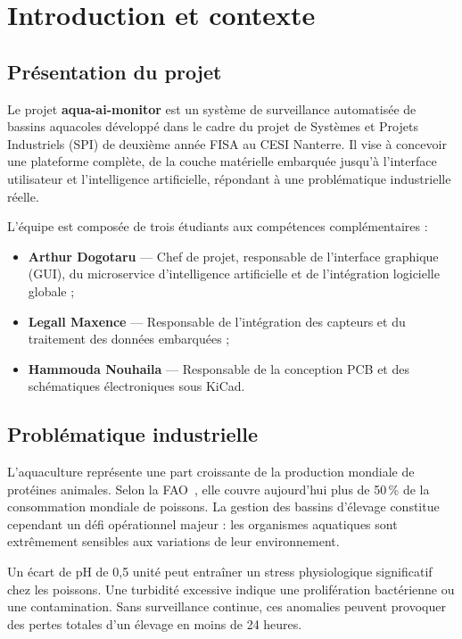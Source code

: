 \documentclass[12pt,a4paper]{report}
\begin{document}
\chapter{Introduction et contexte}

\section{Présentation du projet}

Le projet \textbf{aqua-ai-monitor} est un système de surveillance automatisée de bassins
aquacoles développé dans le cadre du projet de Systèmes et Projets Industriels (SPI) de
deuxième année FISA au CESI Nanterre. Il vise à concevoir une plateforme complète, de la
couche matérielle embarquée jusqu'à l'interface utilisateur et l'intelligence artificielle,
répondant à une problématique industrielle réelle.

L'équipe est composée de trois étudiants aux compétences complémentaires :
\begin{itemize}
  \item \textbf{Arthur Dogotaru} --- Chef de projet, responsable de l'interface graphique (GUI),
        du microservice d'intelligence artificielle et de l'intégration logicielle globale ;
  \item \textbf{Legall Maxence} --- Responsable de l'intégration des capteurs et du traitement
        des données embarquées ;
  \item \textbf{Hammouda Nouhaila} --- Responsable de la conception PCB et des schématiques
        électroniques sous KiCad.
\end{itemize}

\section{Problématique industrielle}

L'aquaculture représente une part croissante de la production mondiale de protéines animales.
Selon la FAO~\cite{fao_aquaculture}, elle couvre aujourd'hui plus de 50\,\% de la consommation
mondiale de poissons. La gestion des bassins d'élevage constitue cependant un défi opérationnel
majeur : les organismes aquatiques sont extrêmement sensibles aux variations de leur environnement.

\begin{warningbox}
Un écart de pH de 0,5 unité peut entraîner un stress physiologique significatif chez les
poissons. Une turbidité excessive indique une prolifération bactérienne ou une contamination.
Sans surveillance continue, ces anomalies peuvent provoquer des pertes totales d'un élevage
en moins de 24 heures.
\end{warningbox}
\end{document}
